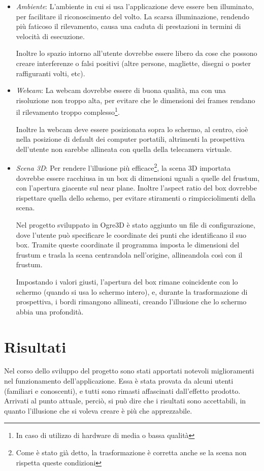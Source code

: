 \begin{itemize}
\item \textit{Ambiente}: L'ambiente in cui si usa l'applicazione deve essere ben illuminato, per facilitare il riconoscimento del volto. La scarsa illuminazione, rendendo più faticoso il rilevamento, causa una caduta di prestazioni in termini di velocità di esecuzione.

Inoltre lo spazio intorno all'utente dovrebbe essere libero da cose che possono creare interferenze o falsi positivi (altre persone, magliette, disegni o poster raffiguranti volti, etc).

\item \textit{Webcam}: La webcam dovrebbe essere di buona qualità, ma con una risoluzione non troppo alta, per evitare che le dimensioni dei frames rendano il rilevamento troppo complesso\footnote{In caso di utilizzo di hardware di media o bassa qualità}.

Inoltre la webcam deve essere posizionata sopra lo schermo, al centro, cioè nella posizione di default dei computer portatili, altrimenti la prospettiva dell'utente non sarebbe allineata con quella della telecamera virtuale.

\item \textit{Scena 3D}: Per rendere l'illusione più efficace\footnote{Come è stato già detto, la trasformazione è corretta anche se la scena non rispetta queste condizioni}, la scena 3D importata dovrebbe essere racchiusa in un box di dimensioni uguali a quelle del frustum, con l'apertura giacente sul near plane. Inoltre l'aspect ratio del box dovrebbe rispettare quella dello schemo, per evitare stiramenti o rimpicciolimenti della scena.

Nel progetto sviluppato in Ogre3D è stato aggiunto un file di configurazione, dove l'utente può specificare le coordinate dei punti che identificano il suo box. Tramite queste coordinate il programma imposta le dimensioni del frustum e trasla la scena centrandola nell'origine, allineandola così con il frustum. 

Impostando i valori giusti, l'apertura del box rimane coincidente con lo schermo (quando si usa lo schermo intero), e, durante la trasformazione di prospettiva, i bordi rimangono allineati, creando l'illusione che lo schermo abbia una profondità.
\end{itemize}

\section{Risultati}
Nel corso dello sviluppo del progetto sono stati apportati notevoli miglioramenti nel funzionamento dell'applicazione. Essa è stata provata da alcuni utenti (familiari e conoscenti), e tutti sono rimasti affascinati dall'effetto prodotto. Arrivati al punto attuale, perciò, si può dire che i risultati sono accettabili, in quanto l'illusione che si voleva creare è più che apprezzabile.

